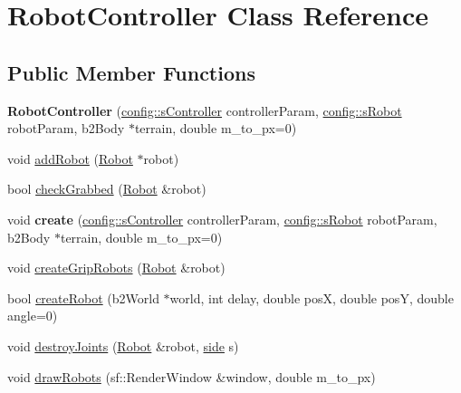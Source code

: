 \hypertarget{class_robot_controller}{}\section{Robot\+Controller Class Reference}
\label{class_robot_controller}
\subsection*{Public Member Functions}
\begin{DoxyCompactItemize}
\item 
\mbox{\label{class_robot_controller_a18526d0c7d6d17c00894ef1cd8d2a974}} 
{\bfseries Robot\+Controller} (\mbox{\hyperlink{structconfig_1_1s_controller}{config\+::s\+Controller}} controller\+Param, \mbox{\hyperlink{structconfig_1_1s_robot}{config\+::s\+Robot}} robot\+Param, b2\+Body $\ast$terrain, double m\+\_\+to\+\_\+px=0)
\item 
void \mbox{\hyperlink{class_robot_controller_a1e3c66846d346e125954dd30bec8ac50}{add\+Robot}} (\mbox{\hyperlink{class_robot}{Robot}} $\ast$robot)
\item 
bool \mbox{\hyperlink{class_robot_controller_a69372797c97d6f9212dc63d2b35b4932}{check\+Grabbed}} (\mbox{\hyperlink{class_robot}{Robot}} \&robot)
\item 
\mbox{\label{class_robot_controller_ae68c8240dde6a4f3545cfbc150bc122d}} 
void {\bfseries create} (\mbox{\hyperlink{structconfig_1_1s_controller}{config\+::s\+Controller}} controller\+Param, \mbox{\hyperlink{structconfig_1_1s_robot}{config\+::s\+Robot}} robot\+Param, b2\+Body $\ast$terrain, double m\+\_\+to\+\_\+px=0)
\item 
void \mbox{\hyperlink{class_robot_controller_a6b0bdb7620acbf40f48426e30ff0b759}{create\+Grip\+Robots}} (\mbox{\hyperlink{class_robot}{Robot}} \&robot)
\item 
bool \mbox{\hyperlink{class_robot_controller_ad79af125e28750338e0da1fb35d0b72d}{create\+Robot}} (b2\+World $\ast$world, int delay, double posX, double posY, double angle=0)
\item 
void \mbox{\hyperlink{class_robot_controller_a62fac365f203e2f826efb9b7b7e56854}{destroy\+Joints}} (\mbox{\hyperlink{class_robot}{Robot}} \&robot, \mbox{\hyperlink{_robot_8h_afc015eff6557e84151d2e53b94375445}{side}} s)
\item 
void \mbox{\hyperlink{class_robot_controller_a2d4d4c93aed605c945e7a95876825bdc}{draw\+Robots}} (sf\+::\+Render\+Window \&window, double m\+\_\+to\+\_\+px)

\end{DoxyCompactItemize}
